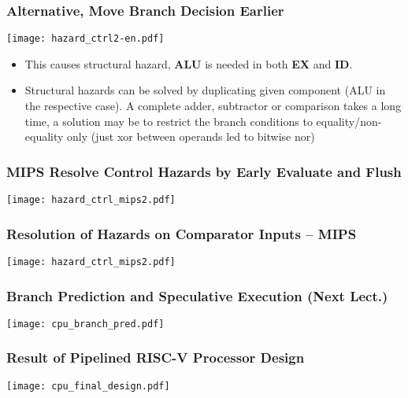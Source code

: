 \documentclass{beamer}
\begin{document}
\begin{frame}
\frametitle{Alternative, Move Branch Decision Earlier}
\texttt{[image: hazard\_ctrl2-en.pdf]}

\begin{itemize}
 \item This causes structural hazard, \textbf{ALU} is needed in both \textbf{EX} and \textbf{ID}.
 \item Structural hazards can be solved by duplicating given component (ALU in the respective case). A complete adder, subtractor or comparison
       takes a long time, a solution may be to restrict the branch conditions to equality/non-equality only (just xor
       between operands led to bitwise nor)
\end{itemize}

\end{frame}

\begin{frame}
\frametitle{MIPS Resolve Control Hazards by Early Evaluate and Flush}
\texttt{[image: hazard\_ctrl\_mips2.pdf]}
\end{frame}

\begin{frame}
\frametitle{Resolution of Hazards on Comparator Inputs -- MIPS}
\texttt{[image: hazard\_ctrl\_mips2.pdf]}
\end{frame}

\begin{frame}
\frametitle{Branch Prediction and Speculative Execution (Next Lect.)}
\texttt{[image: cpu\_branch\_pred.pdf]}
\end{frame}

\begin{frame}
\frametitle{Result of Pipelined RISC-V Processor Design}
\texttt{[image: cpu\_final\_design.pdf]}
\end{frame}
\end{document}
